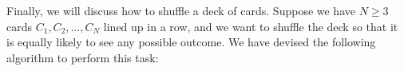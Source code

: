 \documentclass[12pt]{article}
\theoremstyle{plain}
\theoremstyle{definition}
\theoremstyle{remark}
\begin{document}
\begin{enumerate}
\begin{comment}
\begin{algorithm}[H]
\DontPrintSemicolon
\KwData{none}
\KwResult{a random number $X\sim\text{Bernoulli}(p)$}
\For{$k=1,2,3,\dots$}{
$c_k\gets\textbf{B}(1/2)$\;
\If{$0.c_1c_2\dots c_k<0.b_1b_2\dots b_k$}{
\Return{$1$}\;
}
\If{$0.c_1c_2\dots c_k>0.b_1b_2\dots b_k$}{
\Return{$0$}\;
}
}
\end{algorithm}

The probability it doesn't terminate after $n$ steps is $(1/2)^n\to0$, the case where $(c_1,c_2,\dots,c_n)=(b_1,b_2,\dots,b_n)$. If it terminates in at most $n$ steps, then it returns $1$ for $b_1b_2\dots b_n$ values. There are $2^n$ possible outcomes in total, so the probability of this happening is \[\frac{b_1b_2\dots b_n}{2^n}\to p\text{ as }n\to\infty\] Now, the probability it returns $0$ is \[\frac{2^n-b_1b_2\dots b_n-1}{2^n}\to1-p\text{ as }n\to\infty\] as desired.
\end{tcolorbox}\end{comment}
\end{enumerate}

\newpage

Finally, we will discuss how to shuffle a deck of cards. Suppose we have $N\ge3$ cards $C_1,C_2,\dots,C_N$ lined up in a row, and we want to shuffle the deck so that it is equally likely to see any possible outcome. We have devised the following algorithm to perform this task:

\begin{algorithm}
\DontPrintSemicolon
{}
\end{algorithm}

\vspace{-10pt}
\end{document}
